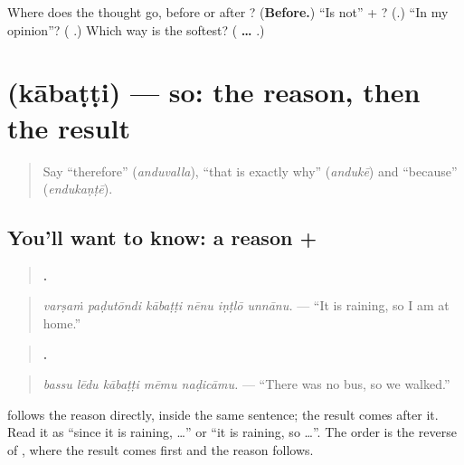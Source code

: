 \begin{tcolorbox}[breakable,colback=teal!4,colframe=teal!35!black,title={Before you move on}]
Where does the thought go, before or after \textbf{}? (\textbf{Before.}) \textquotedblleft{}Is not\textquotedblright{} + \textbf{}? (\textbf{}.) \textquotedblleft{}In my opinion\textquotedblright{}? (\textbf{ }.) Which way is the softest? (\textbf{ … }.)
\end{tcolorbox}
\section[\texorpdfstring{\te{కాబట్టి} (kābaṭṭi)}{కాబట్టి (kābaṭṭi)}]{ (kābaṭṭi) — so: the reason, then the result}

\label{lesson:TE-C318-kabatti}



\begin{quote}
Say \textquotedblleft{}therefore\textquotedblright{} (\emph{anduvalla}), \textquotedblleft{}that is exactly why\textquotedblright{} (\emph{andukē}) and \textquotedblleft{}because\textquotedblright{} (\emph{endukaṇṭē}).
\end{quote}

\subsection*{You'll want to know: a reason + }
\begin{quote}
\textbf{     .}
\end{quote}

\begin{quote}
\emph{varṣaṁ paḍutōndi kābaṭṭi nēnu iṇṭlō unnānu.} — \textquotedblleft{}It is raining, so I am at home.\textquotedblright{}
\end{quote}

\begin{quote}
\textbf{    .}
\end{quote}

\begin{quote}
\emph{bassu lēdu kābaṭṭi mēmu naḍicāmu.} — \textquotedblleft{}There was no bus, so we walked.\textquotedblright{}
\end{quote}

\textbf{} follows the reason directly, inside the same sentence; the result comes after it. Read it as \textquotedblleft{}since it is raining, …\textquotedblright{} or \textquotedblleft{}it is raining, so …\textquotedblright{}. The order is the reverse of \textbf{}, where the result comes first and the reason follows.

